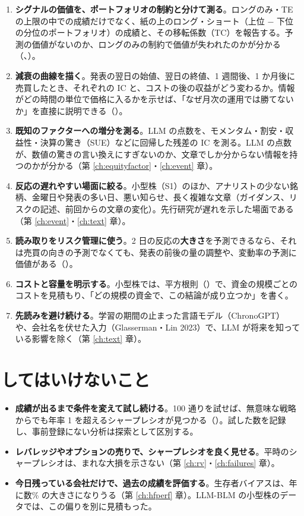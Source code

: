 \begin{enumerate}
\item \textbf{シグナルの価値を、ポートフォリオの制約と分けて測る}。ロングのみ・TE の上限の中での成績だけでなく、紙の上のロング・ショート（上位 − 下位の分位のポートフォリオ）の成績と、その移転係数（TC）を報告する。予測の価値がないのか、ロングのみの制約で価値が失われたのかが分かる（、）。
\item \textbf{減衰の曲線を描く}。発表の翌日の始値、翌日の終値、1 週間後、1 か月後に売買したとき、それぞれの IC と、コストの後の収益がどう変わるか。情報がどの時間の単位で価格に入るかを示せば、「なぜ月次の運用では勝てないか」を直接に説明できる（）。
\item \textbf{既知のファクターへの増分を測る}。LLM の点数を、モメンタム・割安・収益性・決算の驚き（SUE）などに回帰した残差の IC を測る。LLM の点数が、数値の驚きの言い換えにすぎないのか、文章でしか分からない情報を持つのかが分かる（第 \ref{ch:equityfactor}・\ref{ch:event} 章）。
\item \textbf{反応の遅れやすい場面に絞る}。小型株（S1）のほか、アナリストの少ない銘柄、金曜日や発表の多い日、悪い知らせ、長く複雑な文章（ガイダンス、リスクの記述、前回からの文章の変化）。先行研究が遅れを示した場面である（第 \ref{ch:event}・\ref{ch:text} 章）。
\item \textbf{読み取りをリスク管理に使う}。2 日の反応の\textbf{大きさ}を予測できるなら、それは売買の向きの予測でなくても、発表の前後の量の調整や、変動率の予測に価値がある（）。
\item \textbf{コストと容量を明示する}。小型株では、平方根則（）で、資金の規模ごとのコストを見積もり、「どの規模の資金で、この結論が成り立つか」を書く。
\item \textbf{先読みを避け続ける}。学習の期間の止まった言語モデル（ChronoGPT）や、会社名を伏せた入力（Glasserman・Lin 2023）で、LLM が将来を知っている影響を除く（第 \ref{ch:text} 章）。
\end{enumerate}

\section{してはいけないこと}

\begin{itemize}
\item \textbf{成績が出るまで条件を変えて試し続ける}。100 通りを試せば、無意味な戦略からでも年率 1 を超えるシャープレシオが見つかる（）。試した数を記録し、事前登録にない分析は探索として区別する。
\item \textbf{レバレッジやオプションの売りで、シャープレシオを良く見せる}。平時のシャープレシオは、まれな大損を示さない（第 \ref{ch:rv}・\ref{ch:failures} 章）。
\item \textbf{今日残っている会社だけで、過去の成績を評価する}。生存者バイアスは、年に数\% の大きさになりうる（第 \ref{ch:hfperf} 章）。LLM-BLM の小型株のデータでは、この偏りを別に見積もった。
\end{itemize}

